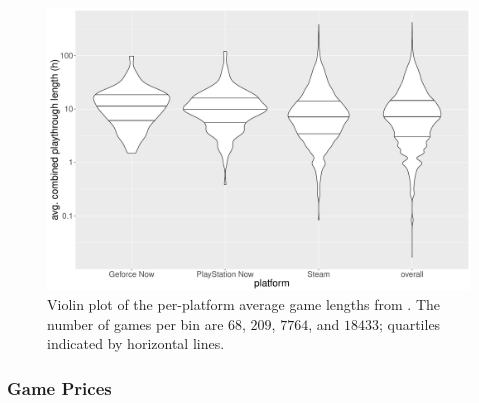 \begin{figure}[!t]
	\centering
	\includegraphics[width=1.0\columnwidth]{images/gamelengths-by-platform-violin.pdf}
	\caption{Violin plot of the per-platform average game lengths from \hltb. The number of games per bin are $68$, $209$, $7764$, and $18433$; quartiles indicated by horizontal lines.}
\label{fig:gamelengths-violin}
\end{figure}



\subsubsection{Game Prices}

